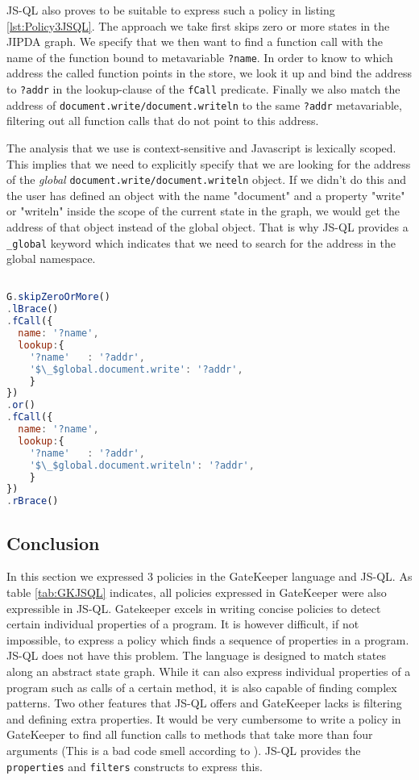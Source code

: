 JS-QL also proves to be suitable to express such a policy in listing \ref{lst:Policy3JSQL}. The approach we take first skips zero or more states in the JIPDA graph. We specify that we then want to find a function call with the name of the function bound to metavariable \texttt{?name}. In order to know to which address the called function points in the store, we look it up and bind the address to \texttt{?addr} in the lookup-clause of the \texttt{fCall} predicate. Finally we also match the address of \texttt{document.write/document.writeln} to the same \texttt{?addr} metavariable, filtering out all function calls that do not point to this address.

The analysis that we use is context-sensitive and Javascript is lexically scoped. This implies that we need to explicitly specify that we are looking for the address of the \textit{global} \texttt{document.write/document.writeln} object. If we didn't do this and the user has defined an object with the name "document" and a property "write" or "writeln" inside the scope of the current state in the graph, we would get the address of that object instead of the global object. That is why JS-QL provides a \texttt{\_global} keyword which indicates that we need to search for the address in the global namespace. 

\begin{lstlisting}[label={lst:Policy3JSQL},language=JavaScript,caption=Policy 3 in JS-QL,mathescape=true]  % float=t?

G.skipZeroOrMore()
.lBrace()
.fCall({
  name: '?name',
  lookup:{
    '?name'   : '?addr',
    '$\_$global.document.write': '?addr',
    }
})
.or()
.fCall({
  name: '?name',
  lookup:{
    '?name'   : '?addr',
    '$\_$global.document.writeln': '?addr',
    }
})
.rBrace()
\end{lstlisting}


\subsection{Conclusion}
 In this section we expressed 3 policies in the GateKeeper language and JS-QL. As table \ref{tab:GKJSQL} indicates, all policies expressed in GateKeeper were also expressible in JS-QL. Gatekeeper excels in writing concise policies to detect certain individual properties of a program. It is however difficult, if not impossible, to express a policy which finds a sequence of properties in a program. JS-QL does not have this problem. The language is designed to match states along an abstract state graph. While it can also express individual properties of a program such as calls of a certain method, it is also capable of finding complex patterns. Two other features that JS-QL offers and GateKeeper lacks is filtering and defining extra properties. It would be very cumbersome to write a policy in GateKeeper to find all function calls to methods that take more than four arguments (This is a bad code smell according to \cite{MaintainableSoftware}). JS-QL provides the \texttt{properties} and \texttt{filters} constructs to express this.

